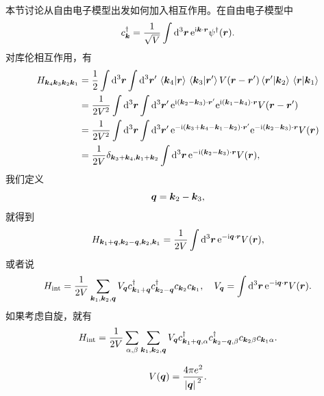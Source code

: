 本节讨论从自由电子模型出发如何加入相互作用。在自由电子模型中
\begin{equation}
    c^\dagger_{\vb*{k}} = \frac{1}{\sqrt{V}} \int \dd[3]{\vb*{r}} \mathrm{e}^{\mathrm{i} \vb*{k} \cdot \vb*{r}} \psi^\dagger(\vb*{r}).
\end{equation}
对库伦相互作用，有
\[
    \begin{aligned}
        H_{\vb*{k}_4 \vb*{k}_3 \vb*{k}_2 \vb*{k}_1} &= \frac{1}{2} \int \dd[3]{\vb*{r}} \int \dd[3]{\vb*{r}'} \braket*{\vb*{k}_4}{\vb*{r}} \braket*{\vb*{k}_3}{\vb*{r}'} V(\vb*{r} - \vb*{r}') \braket*{\vb*{r}'}{\vb*{k}_2} \braket*{\vb*{r}}{\vb*{k}_1}  \\
        &= \frac{1}{2 V^2} \int \dd[3]{\vb*{r}} \int \dd[3]{\vb*{r}'} \mathrm{e}^{\mathrm{i} (\vb*{k}_2 - \vb*{k}_3) \cdot \vb*{r}'} \mathrm{e}^{\mathrm{i} (\vb*{k}_1 - \vb*{k}_4) \cdot \vb*{r}} V(\vb*{r} - \vb*{r}') \\
        &= \frac{1}{2V^2} \int \dd[3]{\vb*{r}} \int \dd[3]{\vb*{r}'} \mathrm{e}^{- \mathrm{i} (\vb*{k}_3 + \vb*{k}_4 - \vb*{k}_1 - \vb*{k}_2) \cdot \vb*{r}'} \mathrm{e}^{- \mathrm{i}(\vb*{k}_2 - \vb*{k}_3) \cdot \vb*{r}} V(\vb*{r}) \\
        &= \frac{1}{2V} \delta_{\vb*{k}_3 + \vb*{k}_4, \vb*{k}_1 + \vb*{k}_2} \int \dd[3]{\vb*{r}} \mathrm{e}^{- \mathrm{i} (\vb*{k}_2 - \vb*{k}_3) \cdot \vb*{r}} V(\vb*{r}),
    \end{aligned}
\]
我们定义
\[
    \vb*{q} = \vb*{k}_2 - \vb*{k}_3,
\]
就得到
\begin{equation}
    H_{\vb*{k}_1 + \vb*{q}, \vb*{k}_2 - \vb*{q}, \vb*{k}_2, \vb*{k}_1} = \frac{1}{2V} \int \dd[3]{\vb*{r}} \mathrm{e}^{- \mathrm{i} \vb*{q} \cdot \vb*{r}} V(\vb*{r}),
\end{equation}
或者说
\begin{equation}
    H_\text{int} = \frac{1}{2V} \sum_{\vb*{k}_1, \vb*{k}_2, \vb*{q}} V_{\vb*{q}} c^\dagger_{\vb*{k}_1 + \vb*{q}} c^\dagger_{\vb*{k}_2 - \vb*{q}} c_{\vb*{k}_2} c_{\vb*{k}_1} , \quad V_{\vb*{q}} = \int \dd[3]{\vb*{r}} \mathrm{e}^{- \mathrm{i} \vb*{q} \cdot \vb*{r}} V(\vb*{r}).
\end{equation}
如果考虑自旋，就有
\begin{equation}
    H_\text{int} = \frac{1}{2V} \sum_{\alpha, \beta} \sum_{\vb*{k}_1, \vb*{k}_2, \vb*{q}} V_{\vb*{q}} c^\dagger_{\vb*{k}_1 + \vb*{q}, \alpha} c^\dagger_{\vb*{k}_2 - \vb*{q}, \beta} c_{\vb*{k}_2 \beta} c_{\vb*{k}_1 \alpha}.
\end{equation}

\begin{equation}
    V(\vb*{q}) = \frac{4\pi e^2}{\abs*{\vb*{q}}^2}.
\end{equation}


